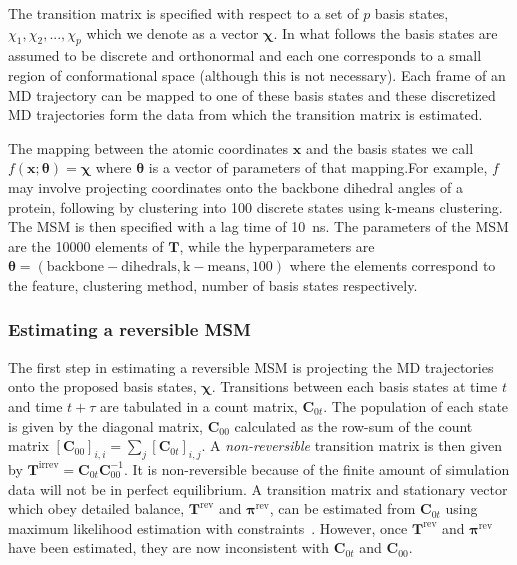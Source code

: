 \documentclass[journal=jacsat,manuscript=article]{achemso}
\begin{document}
The transition matrix is specified with respect to a set of $p$ basis states, $\chi_1, \chi_2, ..., \chi_p$ which we denote as a vector $\bm{\chi}$. In what follows the basis states are assumed to be discrete and orthonormal and each one corresponds to a small region of conformational space (although this is not necessary).  Each frame of an MD trajectory can be mapped to one of these basis states and these discretized MD trajectories form the data from which the transition matrix is estimated.

The mapping between the atomic coordinates $\mathbf{x}$ and the basis states we call $f(\mathbf{x}; \bm{\theta}) =  \bm{\chi}$ where $\bm{\theta}$ is a vector of parameters of that mapping.For example, $f$ may involve projecting coordinates onto the backbone dihedral angles of a protein, following by clustering into \num{100} discrete states using k-means clustering. The MSM is then specified with a lag time of \SI{10}{\nano\second}. The parameters of the MSM are the \num{10000} elements of $\mathbf{T}$, while the hyperparameters are $\bm{\theta}=(\mathrm{backbone-dihedrals}, \mathrm{k-means}, 100)$ where the elements correspond to the feature, clustering method, number of basis states respectively.  

\subsubsection{Estimating a reversible MSM}


The first step in estimating a reversible MSM is projecting the MD trajectories onto the proposed basis states, $\bm{\chi}$. Transitions between each basis states at time $t$ and time $t + \tau$ are tabulated in a count matrix, $\mathbf{C}_{0t}$.  The population of each state is given by the diagonal matrix, $\mathbf{C}_{00}$ calculated as the row-sum of the count matrix $[\mathbf{C}_{00}]_{i, i} = \sum_j [\mathbf{C}_{0t}]_{i, j}$.  A \emph{non-reversible} transition matrix is then given by $\mathbf{T}^{\mathrm{irrev}} = \mathbf{C}_{0t}\mathbf{C}_{00}^{-1}$. It is non-reversible because of the finite amount of simulation data will not be in perfect equilibrium. A transition matrix and stationary vector which obey detailed balance, $\mathbf{T}^{\mathrm{rev}}$ and $\bm{\pi}^{\mathrm{rev}}$, can be estimated from $\mathbf{C}_{0t}$ using maximum likelihood estimation with constraints~\cite{trendelkamp-schroer_estimation_2015}.  However, once $\mathbf{T}^{\mathrm{rev}}$ and $\bm{\pi}^{\mathrm{rev}}$ have been estimated, they are now inconsistent with $\mathbf{C}_{0t}$ and $\mathbf{C}_{00}$. 
\end{document}
